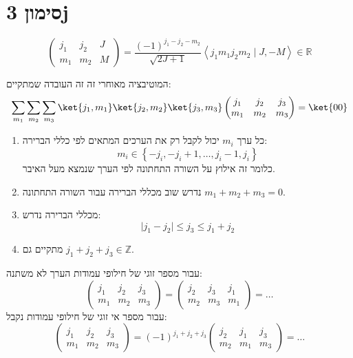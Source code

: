 \documentclass{tstextbook}
\begin{document}
\section{סימון 3j}

\begin{definition}[סימון 3j]
$$\begin{pmatrix}j_{1} & j_{2} & J \\m_{1} & m_{2} & M 
\end{pmatrix}= \frac{(-1)^{j_{1}-j_{2}-m_{2}}}{\sqrt{ 2J+1 }}\left\langle  j_{1}m_{1}j_{2}m_{2}\mid J,-M  \right\rangle \in \mathbb{R}$$

\end{definition}
\begin{remark}
המוטיבציה מאוחרי זה זה העובדה שמתקיים:
$$\sum_{m_{1}}\sum_{m_{2}}\sum_{m_{3}}\ket{j_{1},m_{1}} \ket{j_{2},m_{2}} \ket{j_{3},m_{3}} \begin{pmatrix}j_{1} & j_{2} & j_{3} \\m_{1} & m_{2} & m_{3}
\end{pmatrix}=\ket{00} $$

\end{remark}
\begin{proposition}
  \begin{enumerate}
    \item כל ערך \(m_{i}\) יכול לקבל רק את הערכים המתאים לפי כללי הברירה: 
$$m_{i}\in \left\{  -j_{i},-j_{i}+1 ,\dots ,j_{i}-1, j_{i}  \right\}$$
כלומר זה אילוץ על השורה התחתונה לפי הערך שנמצא מעל האיבר.


    \item נדרש שוב מכללי הברירה עבור השורה התחתונה \(m_{1}+m_{2}+m_{3}=0\). 


    \item מכללי הברירה נדרש: 
$$\lvert j_{1}-j_{2} \rvert \leq j_{3}\leq j_{1}+j_{2}$$


    \item מתקיים גם \(j_{1}+j_{2}+j_{3} \in \mathbb{Z}\). 


  \end{enumerate}
\end{proposition}
\begin{proposition}
עבור מספר זוגי של חילופי עמודות הערך לא משתנה:
$$\begin{pmatrix}j_{1} & j_{2} & j_{3} \\m_{1} & m_{2} & m_{3}\end{pmatrix}=\begin{pmatrix}j_{2} & j_{3} & j_{1} \\m_{2} & m_{3} & m_{1}
\end{pmatrix}=\dots$$
עבור מספר אי זוגי של חילופי עמודות נקבל:
$$\begin{pmatrix}j_{1} & j_{2} & j_{3} \\m_{1} & m_{2} & m_{3} \end{pmatrix}=(-1)^{j_{1}+j_{2}+j_{3}} \begin{pmatrix}j_{2} & j_{1} & j_{3} \\m_{2} & m_{1} & m_{3}
\end{pmatrix}=\dots$$

\end{proposition}
\end{document}
